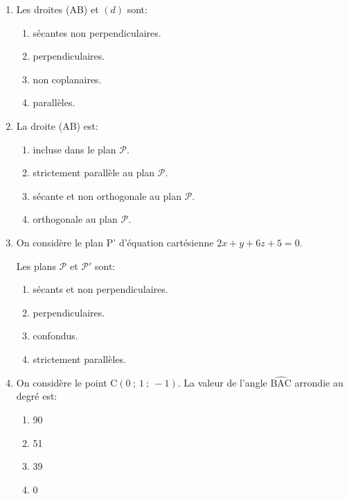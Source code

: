 \medskip
\begin{enumerate}
\item Les droites (AB) et $(d)$ sont:
	\begin{enumerate}
		\item sécantes non perpendiculaires. 
		\item  perpendiculaires.
		\item non coplanaires.
		\item parallèles.
	\end{enumerate}
\item La droite (AB) est:
	\begin{enumerate}
		\item incluse dans le plan $\mathcal{P}$.
		\item strictement parallèle au plan $\mathcal{P}$.
		\item sécante et non orthogonale au plan $\mathcal{P}$.
		\item orthogonale au plan $\mathcal{P}$.
	\end{enumerate}
\item On considère le plan P' d'équation cartésienne $2x+y+6z+5 = 0$. 

Les plans $\mathcal{P}$ et $\mathcal{P}'$ sont:
	\begin{enumerate}
		\item sécants et non perpendiculaires.
		\item perpendiculaires.
		\item confondus.
		\item strictement parallèles.
	\end{enumerate}
\item On considère le point C$(0~;~1~;~-1)$. La valeur de l'angle $\widehat{\text{BAC}}$ arrondie au degré est: 
	\begin{enumerate}
		\item 90\degres
		\item 51\degres
		\item 39\degres
		\item 0\degres
	\end{enumerate}
\end{enumerate}

\bigskip


